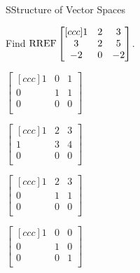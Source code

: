 \documentclass{article}[12pt]
\begin{document}
\begin{module}{S}{Structure of Vector Spaces}
\begin{readinessAssuranceTest}
  \item Find
    \(\operatorname{RREF}
      \begin{bmatrix}[ccc]
        1 & 2 & 3 \\
        3 & 2 & 5 \\
        -2 & 0 & -2 \\
      \end{bmatrix}
    \).
    \begin{multicols}{4}
    \begin{readinessAssuranceTestChoices}
    \item
      \(
        \begin{bmatrix}[ccc]
          1 & 0 & 1 \\
          0 & 1 & 1 \\
          0 & 0 & 0 \\
        \end{bmatrix}
      \) %
    \item
      \(
        \begin{bmatrix}[ccc]
          1 & 2 & 3 \\
          1 & 3 & 4 \\
          0 & 0 & 0 \\
        \end{bmatrix}
      \)
    \item
      \(
        \begin{bmatrix}[ccc]
          1 & 2 & 3 \\
          0 & 1 & 1 \\
          0 & 0 & 0 \\
        \end{bmatrix}
      \)
    \item
      \(
        \begin{bmatrix}[ccc]
          1 & 0 & 0 \\
          0 & 1 & 0 \\
          0 & 0 & 1 \\
        \end{bmatrix}
      \) %
    \end{readinessAssuranceTestChoices}
    \end{multicols}


\end{readinessAssuranceTest}
\end{module}
\end{document}
